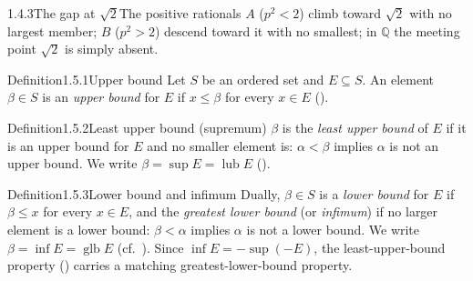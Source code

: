 \documentclass[main.tex]{subfiles}
\begin{document}
\begin{Fig}{1.4.3}{The gap at $\sqrt2$}{The positive rationals $A$ ($p^2<2$) climb toward $\sqrt2$ with no largest member; $B$ ($p^2>2$) descend toward it with no smallest; in $\mathbb Q$ the meeting point $\sqrt2$ is simply absent.}
\end{Fig}


\begin{Obj}{Definition}{1.5.1}{Upper bound}
Let $S$ be an ordered set and $E\subseteq S$. An element $\beta\in S$ is an \emph{upper bound}
for $E$ if $x\le\beta$ for every $x\in E$ ().
\end{Obj}

\begin{Obj}{Definition}{1.5.2}{Least upper bound (supremum)}
$\beta$ is the \emph{least upper bound} of $E$ if it is an upper bound for $E$ and no smaller
element is: $\alpha<\beta$ implies $\alpha$ is not an upper bound. We write
$\beta=\sup E=\operatorname{lub}E$ ().
\end{Obj}

\begin{Obj}{Definition}{1.5.3}{Lower bound and infimum}
Dually, $\beta\in S$ is a \emph{lower bound} for $E$ if $\beta\le x$ for every $x\in E$, and the
\emph{greatest lower bound} (or \emph{infimum}) if no larger element is a lower bound: $\beta<\alpha$
implies $\alpha$ is not a lower bound. We write $\beta=\inf E=\operatorname{glb}E$ (cf.\ ). Since
$\inf E=-\sup(-E)$, the least-upper-bound property () carries a matching
greatest-lower-bound property.
\end{Obj}

\end{document}
